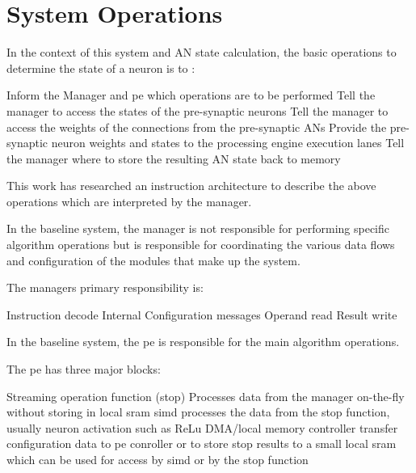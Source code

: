 

\chapter{System Operations}
\label{chap-three}

In the context of this system and AN state calculation, the basic operations to determine the state of a neuron is to :
\begin{outline}
    \1 Inform the Manager and \ac{pe} which operations are to be performed
    \1 Tell the manager to access the states of the pre-synaptic neurons
    \1 Tell the manager to access the weights of the connections from the pre-synaptic ANs
    \1 Provide the pre-synaptic neuron weights and states to the processing engine execution lanes
    \1 Tell the manager where to store the resulting AN state back to memory
\end{outline}


This work has researched an instruction architecture to describe the above operations which are interpreted by the manager. 

In the baseline system, the manager is not responsible for performing specific algorithm operations but is responsible for coordinating the various data flows and configuration of the modules that make up the system.

The managers primary responsibility is:

\begin{outline}
    \1 Instruction decode
    \1 Internal Configuration messages
    \1 Operand read
    \1 Result write
\end{outline}

In the baseline system, the \ac{pe} is responsible for the main algorithm operations.

The \ac{pe} has three major blocks:

\begin{outline}
    \1 Streaming operation function (\ac{stop})
      \2 Processes data from the manager on-the-fly without storing in local \ac{sram}
    \1 \ac{simd}
      \2 processes the data from the \ac{stop} function, usually neuron activation such as ReLu
    \1 DMA/local memory controller
      \2 transfer configuration data to \ac{pe} conroller or to store \ac{stop} results to a small local \ac{sram} which can be used for access by \ac{simd} or by the \ac{stop} function
\end{outline}
